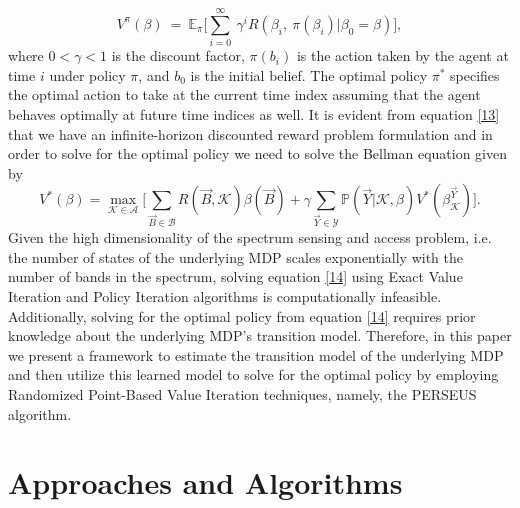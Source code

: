 \documentclass[10pt,twocolumn]{IEEEtran}
\begin{document}
\begin{equation}\label{13}
V^{\pi}(\beta)\ =\ \mathbb{E}_{\pi}\Big[\sum_{i=0}^{\infty}\ \gamma^i R(\beta_i,\ \pi(\beta_i)|\beta_0=\beta)\Big],
\end{equation}
where $0 < \gamma < 1$ is the discount factor, $\pi(b_i)$ is the action taken by the agent at time $i$ under policy $\pi$, and $b_0$ is the initial belief. The optimal policy $\pi^*$ specifies the optimal action to take at the current time index assuming that the agent behaves optimally at future time indices as well. It is evident from equation \eqref{13} that we have an infinite-horizon discounted reward problem formulation and in order to solve for the optimal policy we need to solve the Bellman equation given by
\begin{equation}\label{14}
    V^*(\beta)=\max_{\mathcal{K}\in\mathcal{A}}\Big[\sum_{\vec{B}\in\mathcal{B}}R(\vec{B},\mathcal{K})\beta(\vec{B})+\gamma \sum_{\vec{Y}\in\mathcal{Y}}\mathbb{P}(\vec{Y}|\mathcal{K},\beta)V^*(\beta_{\mathcal{K}}^{\vec{Y}})\Big].
\end{equation}
Given the high dimensionality of the spectrum sensing and access problem, i.e. the number of states of the underlying MDP scales exponentially with the number of bands in the spectrum, solving equation \eqref{14} using Exact Value Iteration and Policy Iteration algorithms is computationally infeasible. Additionally, solving for the optimal policy from equation \eqref{14} requires prior knowledge about the underlying MDP's transition model. Therefore, in this paper we present a framework to estimate the transition model of the underlying MDP and then utilize this learned model to solve for the optimal policy by employing Randomized Point-Based Value Iteration techniques, namely, the PERSEUS algorithm.
\section{Approaches and Algorithms}\label{III}
\end{document}
